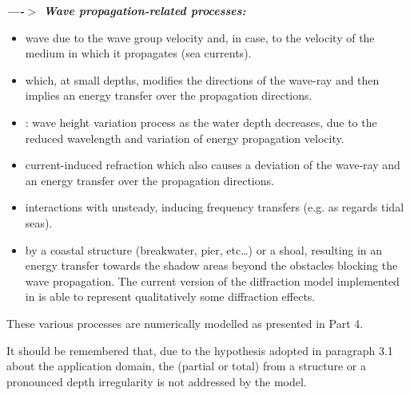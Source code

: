  \textbf{\textit{----$>$ Wave propagation-related processes:}}
\begin{itemize}

 \item   wave  due to the wave group velocity and, in case, to the velocity of the medium in which it propagates (sea currents).

 \item  {} which, at small depths, modifies the directions of the wave-ray and then implies an energy transfer over the propagation directions.

 \item  {}: wave height variation process as the water depth decreases, due to the reduced wavelength and variation of energy propagation velocity.

 \item  current-induced refraction which also causes a deviation of the wave-ray and an energy transfer over the propagation directions.

 \item  interactions with unsteady, inducing frequency transfers (e.g. as regards tidal seas).

 \item  {} by a coastal structure (breakwater, pier, etc\dots ) or a shoal, resulting in an energy transfer towards the shadow areas beyond the obstacles blocking the wave propagation. The current version of the diffraction model implemented in \tomawac is able to represent qualitatively some diffraction effects.
\end{itemize}

 These various processes are numerically modelled as presented in Part 4.

 It should be remembered that, due to the hypothesis adopted in paragraph 3.1 about the \tomawac application domain, the (partial or total) from a structure or a pronounced depth irregularity is not addressed by the model.

